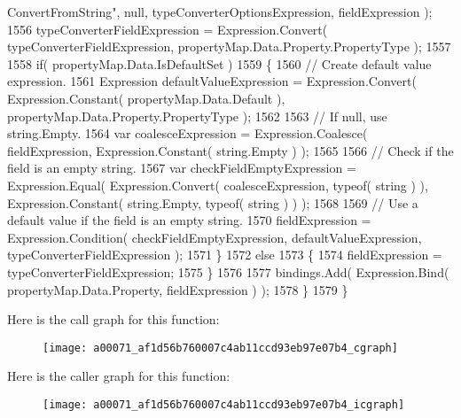 \begin{DoxyCode}
{      ConvertFromString"}, null, typeConverterOptionsExpression, fieldExpression );
1556                 typeConverterFieldExpression = Expression.Convert( typeConverterFieldExpression, 
      propertyMap.Data.Property.PropertyType );
1557 
1558                 \textcolor{keywordflow}{if}( propertyMap.Data.IsDefaultSet )
1559                 \{
1560                     \textcolor{comment}{// Create default value expression.}
1561                     Expression defaultValueExpression = Expression.Convert( Expression.Constant( 
      propertyMap.Data.Default ), propertyMap.Data.Property.PropertyType );
1562 
1563                     \textcolor{comment}{// If null, use string.Empty.}
1564                     var coalesceExpression = Expression.Coalesce( fieldExpression, Expression.Constant( 
      string.Empty ) );
1565 
1566                     \textcolor{comment}{// Check if the field is an empty string.}
1567                     var checkFieldEmptyExpression = Expression.Equal( Expression.Convert( 
      coalesceExpression, typeof( \textcolor{keywordtype}{string} ) ), Expression.Constant( \textcolor{keywordtype}{string}.Empty, typeof( \textcolor{keywordtype}{string} ) ) );
1568 
1569                     \textcolor{comment}{// Use a default value if the field is an empty string.}
1570                     fieldExpression = Expression.Condition( checkFieldEmptyExpression, 
      defaultValueExpression, typeConverterFieldExpression );
1571                 \}
1572                 \textcolor{keywordflow}{else}
1573                 \{
1574                     fieldExpression = typeConverterFieldExpression;
1575                 \}
1576 
1577                 bindings.Add( Expression.Bind( propertyMap.Data.Property, fieldExpression ) );
1578             \}
1579         \}
\end{DoxyCode}


Here is the call graph for this function\-:
\nopagebreak
\begin{figure}[H]
\begin{center}
\leavevmode
\texttt{[image: a00071\_af1d56b760007c4ab11ccd93eb97e07b4\_cgraph]}
\end{center}
\end{figure}




Here is the caller graph for this function\-:
\nopagebreak
\begin{figure}[H]
\begin{center}
\leavevmode
\texttt{[image: a00071\_af1d56b760007c4ab11ccd93eb97e07b4\_icgraph]}
\end{center}
\end{figure}


